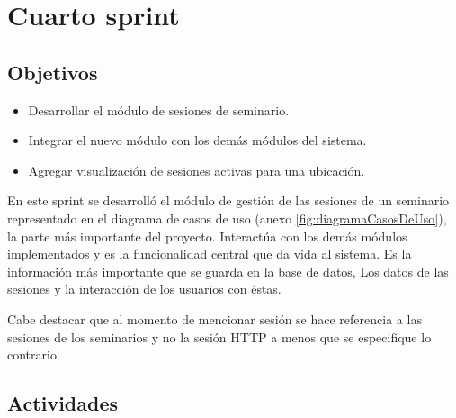 ﻿\section{Cuarto sprint} %
\label{sec:cuarto_sprint}

\subsection{Objetivos}

\begin{itemize}
	\item Desarrollar el módulo de sesiones de seminario.
	\item Integrar el nuevo módulo con los demás módulos del sistema.
	\item Agregar visualización de sesiones activas para una ubicación.
\end{itemize}

En este sprint se desarrolló el módulo de gestión de las sesiones de un seminario representado en el diagrama de casos de uso (anexo \ref{fig:diagramaCasosDeUso}), la parte más importante del proyecto. Interactúa con los demás módulos implementados y es la funcionalidad central que da vida al sistema. Es la información más importante que se guarda en la base de datos, Los datos de las sesiones y la interacción de los usuarios con éstas.

Cabe destacar que al momento de mencionar sesión se hace referencia a las sesiones de los seminarios y no la sesión HTTP a menos que se especifique lo contrario.

\subsection{Actividades} %
\label{sub:actividades4}

